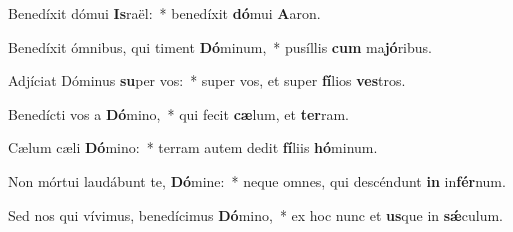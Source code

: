\item Benedíxit dómui \textbf{Is}raël:~* benedíxit \textbf{dó}mui \textbf{A}aron.
\item Benedíxit ómnibus, qui timent \textbf{Dó}minum,~* pusíllis \textbf{cum} ma\textbf{jó}ribus.
\item Adjíciat Dóminus \textbf{su}per vos:~* super vos, et super \textbf{fí}lios \textbf{ves}tros.
\item Benedícti vos a \textbf{Dó}mino,~* qui fecit \textbf{cæ}lum, et \textbf{ter}ram.
\item Cælum cæli \textbf{Dó}mino:~* terram autem dedit \textbf{fí}liis \textbf{hó}minum.
\item Non mórtui laudábunt te, \textbf{Dó}mine:~* neque omnes, qui descéndunt \textbf{in} in\textbf{fér}num.
\item Sed nos qui vívimus, benedícimus \textbf{Dó}mino,~* ex hoc nunc et \textbf{us}que in \textbf{sǽ}culum.
